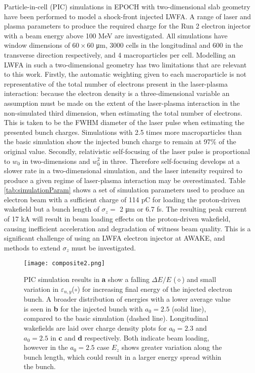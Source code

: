 \documentclass[preprint,5p,times,sort&compress]{elsarticle}
\begin{document}
Particle-in-cell (PIC) simulations in EPOCH \cite{Arber2015a} with two-dimensional slab geometry have been performed to model a shock-front injected LWFA. A range of laser and plasma parameters to produce the required charge for the Run 2 electron injector with a beam energy above 100 MeV are investigated. All simulations have window dimensions of $60 \times 60$ \si{\micro\meter}, 3000 cells in the longitudinal and 600 in the transverse direction respectively, and 4 macroparticles per cell. Modelling an LWFA in such a two-dimensional geometry has two limitations that are relevant to this work. Firstly, the automatic weighting given to each macroparticle is not representative of the total number of electrons present in the laser-plasma interaction: because the electron density is a three-dimensional variable an assumption must be made on the extent of the laser-plasma interaction in the non-simulated third dimension, when estimating the total number of electrons. This is taken to be the FWHM diameter of the laser pulse when estimating the presented bunch charges. Simulations with 2.5 times more macroparticles than the basic simulation show the injected bunch charge to remain at 97\% of the original value. Secondly, relativistic self-focusing of the laser pulse is proportional to $w_0$ in two-dimensions and $w_0^2$ in three. Therefore self-focusing develops at a slower rate in a two-dimensional simulation, and the laser intensity required to produce a given regime of laser-plasma interaction may be overestimated. Table \ref{tab:simulationParam} shows a set of simulation parameters used to produce an electron beam with a sufficient charge of 114 pC for loading the proton-driven wakefield but a bunch length of $\sigma_z = $ 2 \si{\micro\meter} or 6.7 \si{\femto\second}. The resulting peak current of 17 kA will result in beam loading effects on the proton-driven wakefield, causing inefficient acceleration and degradation of witness beam quality. This is a significant challenge of using an LWFA electron injector at AWAKE, and methods to extend $\sigma_z$ must be investigated. 

\begin{figure}[htb]\centering
	\texttt{[image: composite2.png]}
	\caption{PIC simulation results in \textbf{a} show a falling $\Delta E / E $ ($\diamond$) and small variation in $\varepsilon_{n,y}$($\circ$) for increasing final energy of the injected electron bunch. A broader distribution of energies with a lower average value is seen in \textbf{b} for the injected bunch with $a_0 = 2.5$ (solid line), compared to the basic simulation (dashed line). Longitudinal wakefields are laid over charge density plots for $a_0 = 2.3$ and $a_0 = 2.5$ in \textbf{c} and \textbf{d} respectively. Both indicate beam loading, however in the $a_0 = 2.5$ case $E_z$ shows greater variation along the bunch length, which could result in a larger energy spread within the bunch.}
	\label{fig:composite2}
\end{figure}
\end{document}
